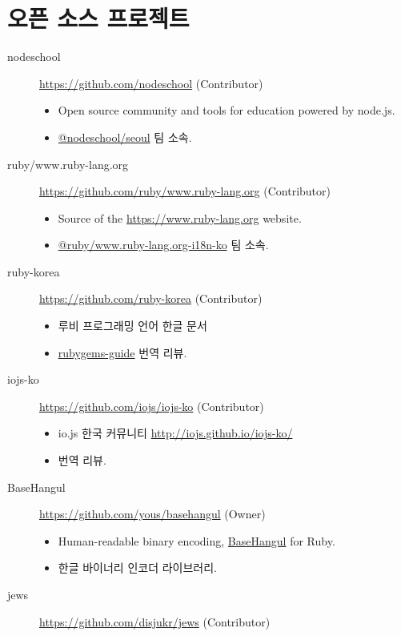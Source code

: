 \documentclass[a4paper,10pt]{article}
\begin{document}
\section{오픈 소스 프로젝트}
\begin{description}
  \item[nodeschool] \url{https://github.com/nodeschool} (Contributor)
    \begin{itemize}
      \item Open source community and tools for education powered by node.js.
      \item \href{https://github.com/orgs/nodeschool/teams/seoul}{@nodeschool/seoul} 팀 소속.
    \end{itemize}
  \item[ruby/www.ruby-lang.org] \url{https://github.com/ruby/www.ruby-lang.org} (Contributor)
    \begin{itemize}
      \item Source of the \url{https://www.ruby-lang.org} website.
      \item \href{https://github.com/orgs/ruby/teams/www-ruby-lang-org-i18n-ko}{@ruby/www.ruby-lang.org-i18n-ko} 팀 소속.
    \end{itemize}
  \item[ruby-korea] \url{https://github.com/ruby-korea} (Contributor)
    \begin{itemize}
      \item 루비 프로그래밍 언어 한글 문서
      \item \href{https://github.com/ruby-korea/rubygems-guides}{rubygems-guide} 번역 리뷰.
    \end{itemize}
  \item[iojs-ko] \url{https://github.com/iojs/iojs-ko} (Contributor)
    \begin{itemize}
      \item io.js 한국 커뮤니티 \url{http://iojs.github.io/iojs-ko/}
      \item 번역 리뷰.
    \end{itemize}
  \item[BaseHangul] \url{https://github.com/yous/basehangul} (Owner)
    \begin{itemize}
      \item Human-readable binary encoding, \href{https://basehangul.github.io}{BaseHangul} for Ruby.
      \item 한글 바이너리 인코더 라이브러리.
    \end{itemize}
  \item[jews] \url{https://github.com/disjukr/jews} (Contributor)

\end{description}
\end{document}
